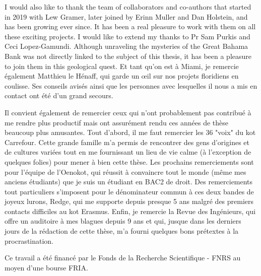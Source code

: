 I would also like to thank the team of collaborators and co-authors that started in 2019 with Lew Gramer, later joined by Erinn Muller and Dan Holstein, and has been growing ever since. It has been a real pleasure to work with them on all these exciting projects. I would like to extend my thanks to Pr Sam Purkis and Ceci Lopez-Gamundi. Although unraveling the mysteries of the Great Bahama Bank was not directly linked to the subject of this thesis, it has been a pleasure to join them in this geological quest. Et tant qu’on est à Miami, je remercie également Matthieu le Hénaff, qui garde un œil sur nos projets floridiens en coulisse. Ses conseils avisés ainsi que les personnes avec lesquelles il nous a mis en contact ont été d’un grand secours.

Il convient également de remercier ceux qui n'ont probablement pas contribué à me rendre plus productif mais ont assurément rendu ces années de thèse beaucoup plus amusantes. Tout d'abord, il me faut remercier les 36 "voix" du kot Carrefour. Cette grande famille m'a permis de rencontrer des gens d'origines et de cultures variées tout en me fournissant un lieu de vie calme (à l’exception de quelques folies) pour mener à bien cette thèse. Les prochains remerciements sont pour l’équipe de l'Oenokot, qui réussit à convaincre tout le monde (même mes anciens étudiants) que je suis un étudiant en BAC2 de droit. Des remerciements tout particuliers s'imposent pour le dénominateur commun à ces deux bandes de joyeux lurons, Redge, qui me supporte depuis presque 5 ans malgré des premiers contacts difficiles au kot Erasmus. Enfin, je remercie la Revue des Ingénieurs, qui offre un auditoire à mes blagues depuis 9 ans et qui, jusque dans les derniers jours de la rédaction de cette thèse, m’a fourni quelques bons prétextes à la procrastination.

\vspace{3em}

Ce travail a été financé par le Fonds de la Recherche Scientifique - FNRS au moyen d’une bourse FRIA.
